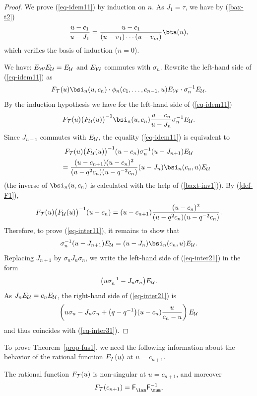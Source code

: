 \begin{proof} We prove (\ref{eq-idem11}) by induction on $n$.
As $J_1=\tau$, we have by (\ref{bax-t2})
\[
\frac{u-c_{1}}{u-J_{1}}=\frac{u-c_{1}}{(u-v_1)\cdots(u-v_m)}\bta(u)  ,
\]
which verif\/ies the basis of induction ($n=0$).


We have: $E_{{\cal{W}}}E_{{\cal{U}}}=E_{{\cal{U}}}$ and $E_{{\cal{W}}}$ commutes with $\sigma_n$.
Rewrite the left-hand side of (\ref{eq-idem11}) as
\[
F_{{\cal{T}}}(u)\bsi_{n}(u,c_n)\cdot\phi_n(c_1,\dots,c_{n-1},u) E_{{\cal{W}}}\cdot\sigma_n^{-1} E_{{\cal{U}}} .
 \]
By the induction hypothesis we have for the left-hand side of (\ref{eq-idem11})
\[
F_{{\cal{T}}}(u)\bigl(F_{{\cal{U}}}(u)\bigr)^{-1}\bsi_{n}(u,c_n)\frac{u-c_n}{u-J_n}\sigma_n^{-1} E_{{\cal{U}}} .
\]
Since $J_{n+1}$ commutes with $E_{{\cal{U}}}$, the equality (\ref{eq-idem11}) is equivalent to
\begin{gather}
F_{{\cal{T}}}(u)\bigl(F_{{\cal{U}}}(u)\bigr)^{-1}(u-c_n)\sigma_n^{-1}(u-J_{n+1})E_{{\cal{U}}}\nonumber\\
\qquad{}=
 {\frac{(u-c_{n+1})(u-c_n)^2}{(u-q^2c_n)(u-q^{-2}c_n)}}(u-J_n)\bsi_{n}(c_n,u)E_{{\cal{U}}} \label{eq-inter11}
\end{gather}
(the inverse of $\bsi_{n}(u,c_n)$ is calculated with the help of (\ref{baxt-inv1})).
By (\ref{def-F1}),
\begin{gather*}%
F_{{\cal{T}}}(u)\bigl(F_{{\cal{U}}}(u)\bigr)^{-1}(u-c_n)=(u-c_{n+1})\frac{(u-c_n)^2}{(u-q^2c_n)(u-q^{-2}c_n)}.
\end{gather*}
Therefore, to prove (\ref{eq-inter11}), it remains to show that
\begin{gather}\label{eq-inter21}
\sigma_n^{-1}(u-J_{n+1})E_{{\cal{U}}}=(u-J_n)\bsi_{n}(c_n,u)E_{{\cal{U}}}.
\end{gather}
Replacing $J_{n+1}$ by $\sigma_nJ_n\sigma_n$, we write the left-hand side of (\ref{eq-inter21}) in the form
\begin{gather}\label{eq-inter31}
\big(u\sigma_n^{-1}-J_{n}\sigma_n\big)E_{{\cal{U}}}  .
\end{gather}
As  $J_nE_{{\cal{U}}}=c_nE_{{\cal{U}}}$, the right-hand side of (\ref{eq-inter21}) is
\begin{gather*}%
\left(u\sigma_n-J_n\sigma_n+\big(q-q^{-1}\big)(u-c_n)\frac{u}{c_n-u}\right)E_{{\cal{U}}}
\end{gather*}
and thus coincides with  (\ref{eq-inter31}).
\end{proof}


To prove Theorem~\ref{prop-fus1}, we need the following
information about the behavior of the rational function $F_{{\cal{T}}}(u)$ at $u=c_{n+1}$.
\begin{Proposition}\label{prop-f1}
The rational function $F_{{\cal{T}}}(u)$ is non-singular at $u=c_{n+1}$, and moreover
\begin{gather*}%
F_{{\cal{T}}}(c_{n+1})=\mathsf{F}^{\phantom{-1}}_{\lam}  \mathsf{F}_{\mum}^{-1} ,
\end{gather*}
\end{Proposition}

